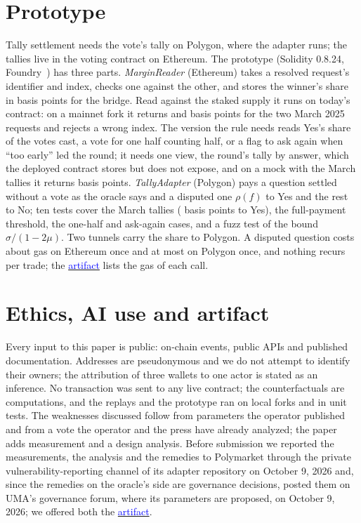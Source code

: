 \documentclass[conference,compsoc]{IEEEtran}
\makeatletter
\newcommand{\artifactlink}[1]{\texorpdfstring{\href{https://github.com/submissionrepo/too-big-to-vote-on-artifact}{\textcolor{blue}{#1}}}{#1}}
\renewcommand\paragraph{\@startsection{paragraph}{4}{2\parindent}{0ex plus 0.1ex minus 0.1ex}{0ex}{\normalfont\normalsize\itshape}}
\newcommand{\muparam}{\mu}
\newcommand{\disclosurePolymarketDate}{October 9, 2026}
\newcommand{\disclosureUmaDate}{October 9, 2026}
\makeatother
\begin{document}
\section{Prototype}
\label{sec:prototype}
 Tally settlement needs the vote's tally on Polygon, where the adapter runs; the tallies live in the voting contract on Ethereum. The prototype (Solidity 0.8.24, Foundry~\cite{foundry}) has three parts. \emph{MarginReader} (Ethereum) takes a resolved request's identifier and index, checks one against the other, and stores the winner's share in basis points for the bridge. Read against the staked supply it runs on today's contract: on a mainnet fork it returns \forkMarginA{} and \forkMarginB{} basis points for the two March 2025 requests and rejects a wrong index. The version the rule needs reads Yes's share of the votes cast, a vote for one half counting half, or a flag to ask again when ``too early'' led the round; it needs one view, the round's tally by answer, which the deployed contract stores but does not expose, and on a mock with the March tallies it returns \marchYesVotesBps{} basis points. \emph{TallyAdapter} (Polygon) pays a question settled without a vote as the oracle says and a disputed one $\rho(f)$ to Yes and the rest to No; ten tests cover the March tallies (\rampMarchBps{} basis points to Yes), the full-payment threshold, the one-half and ask-again cases, and a fuzz test of the bound $\sigma/(1-2\muparam)$. Two tunnels carry the share to Polygon. A disputed question costs about \gasRegister{} gas on Ethereum once and at most \gasTallyRamp{} on Polygon once, and nothing recurs per trade; the \artifactlink{artifact} lists the gas of each call.

\section{Ethics, AI use and artifact}
\label{sec:discussion}
\paragraph{Ethics}
 Every input to this paper is public: on-chain events, public APIs and published documentation. Addresses are pseudonymous and we do not attempt to identify their owners; the attribution of three wallets to one actor is stated as an inference. No transaction was sent to any live contract; the counterfactuals are computations, and the replays and the prototype ran on local forks and in unit tests. The weaknesses discussed follow from parameters the operator published and from a vote the operator and the press have already analyzed; the paper adds measurement and a design analysis. Before submission we reported the measurements, the analysis and the remedies to Polymarket through the private vulnerability-reporting channel of its adapter repository on \disclosurePolymarketDate{} and, since the remedies on the oracle's side are governance decisions, posted them on UMA's governance forum, where its parameters are proposed, on \disclosureUmaDate{}; we offered both the \artifactlink{artifact}.
\end{document}
